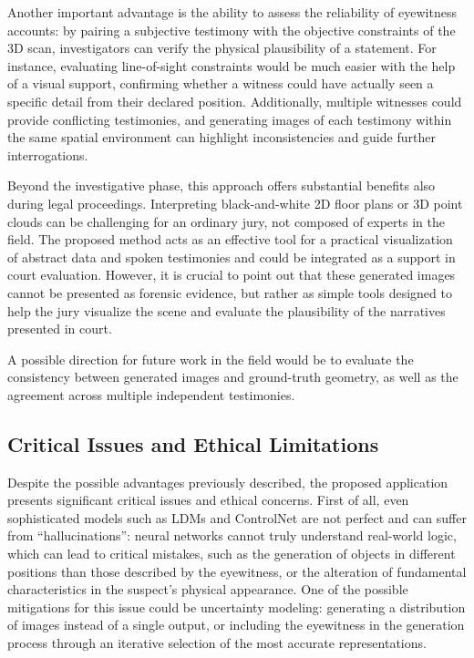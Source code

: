 \documentclass[10pt,twocolumn,letterpaper]{article}
\begin{document}
Another important advantage is the ability to assess the reliability of eyewitness accounts: by pairing a subjective testimony with the objective constraints of the 3D scan, investigators can verify the physical plausibility of a statement. For instance, evaluating line-of-sight constraints would be much easier with the help of a visual support, confirming whether a witness could have actually seen a specific detail from their declared position. Additionally, multiple witnesses could provide conflicting testimonies, and generating images of each testimony within the same spatial environment can highlight inconsistencies and guide further interrogations.

Beyond the investigative phase, this approach offers substantial benefits also during legal proceedings. Interpreting black-and-white 2D floor plans or 3D point clouds can be challenging for an ordinary jury, not composed of experts in the field. The proposed method acts as an effective tool for a practical visualization of abstract data and spoken testimonies and could be integrated as a support in court evaluation. However, it is crucial to point out that these generated images cannot be presented as forensic evidence, but rather as simple tools designed to help the jury visualize the scene and evaluate the plausibility of the narratives presented in court.

A possible direction for future work in the field would be to evaluate the consistency between generated images and ground-truth geometry, as well as the agreement across multiple independent testimonies.

\subsection{Critical Issues and Ethical Limitations}

Despite the possible advantages previously described, the proposed application presents significant critical issues and ethical concerns. First of all, even sophisticated models such as LDMs and ControlNet are not perfect and can suffer from ``hallucinations'': neural networks cannot truly understand real-world logic, which can lead to critical mistakes, such as the generation of objects in different positions than those described by the eyewitness, or the alteration of fundamental characteristics in the suspect's physical appearance. One of the possible mitigations for this issue could be uncertainty modeling: generating a distribution of images instead of a single output, or including the eyewitness in the generation process through an iterative selection of the most accurate representations.
\end{document}
